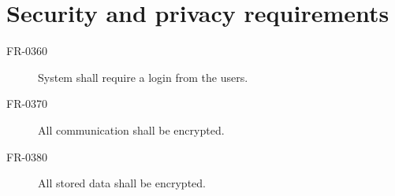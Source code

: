 \section{Security and privacy requirements}

\begin{description}
\item[FR-0360] System shall require a login from the users.
\item[FR-0370] All communication shall be encrypted.
\item[FR-0380] All stored data shall be encrypted.
\end{description}
